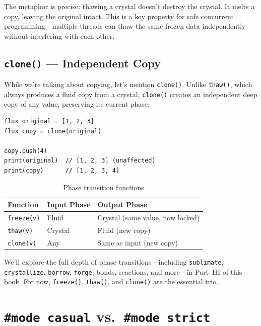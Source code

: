 The metaphor is precise: thawing a crystal doesn't destroy the crystal.
It melts a copy, leaving the original intact.
This is a key property for safe concurrent programming---multiple threads can thaw the same frozen data independently without interfering with each other.

\subsection{\texttt{clone()} --- Independent Copy}\label{subsec:clone-detail}

While we're talking about copying, let's mention \lstinline|clone()|.
Unlike \lstinline|thaw()|, which always produces a fluid copy from a crystal, \lstinline|clone()| creates an independent deep copy of any value, preserving its current phase:

\begin{lstlisting}[language=Lattice, caption={Cloning preserves phase}]
flux original = [1, 2, 3]
flux copy = clone(original)

copy.push(4)
print(original)  // [1, 2, 3] (unaffected)
print(copy)      // [1, 2, 3, 4]
\end{lstlisting}

\begin{table}[h]
\centering
\begin{tabular}{lll}
\toprule
\textbf{Function} & \textbf{Input Phase} & \textbf{Output Phase} \\
\midrule
\lstinline|freeze(v)| & Fluid & Crystal (same value, now locked) \\
\lstinline|thaw(v)| & Crystal & Fluid (new copy) \\
\lstinline|clone(v)| & Any & Same as input (new copy) \\
\bottomrule
\end{tabular}
\caption{Phase transition functions}\label{tab:phase-transitions}
\end{table}

We'll explore the full depth of phase transitions---including \lstinline|sublimate|, \lstinline|crystallize|, \lstinline|borrow|, \lstinline|forge|, bonds, reactions, and more---in Part~III of this book.
For now, \lstinline|freeze()|, \lstinline|thaw()|, and \lstinline|clone()| are the essential trio.

\section{\texttt{\#mode casual} vs.\ \texttt{\#mode strict}}\label{sec:casual-strict}

